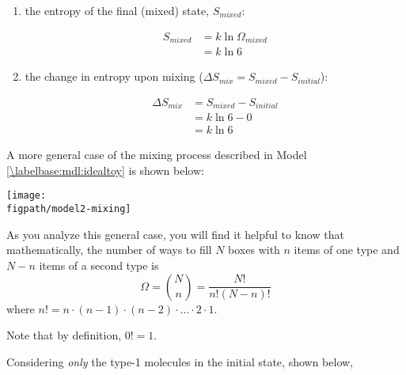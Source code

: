 \begin{activity}
\begin{ctqs}
\begin{enumerate}
			\item the entropy of the final (mixed) state, $S_{mixed}$:
			
				\begin{solution}[0.75in]
					\begin{align*}
						S_{mixed} &= k\ln\Omega_{mixed} \\
							&= k \ln 6
					\end{align*}
				\end{solution}
				
			\item the change in entropy upon mixing ($\Delta S_{mix} = S_{mixed} - S_{initial}$): 
			
				\begin{solution}[0.75in]
					\begin{align*}
						\Delta S_{mix} &= S_{mixed} - S_{initial} \\
							&= k \ln 6 - 0\\
							&= k \ln 6
					\end{align*}
				\end{solution}
				
		\end{enumerate}
		
\end{ctqs}

\begin{model}
	\label{\labelbase:mdl:idealgeneral}

	A more general case of the mixing process described in Model \ref{\labelbase:mdl:idealtoy} is shown below:
	
	\centerline{\texttt{[image: \\figpath/model2-mixing]}}
	
	As you analyze this general case, you will find it helpful to know that mathematically, the number of ways to fill $N$ boxes with $n$ items of one type and $N-n$ items of a second type is
	\begin{equation*}
		\Omega = {N \choose n} = \frac{N!}{n!(N-n)!}
	\end{equation*}
	where $n! = n\cdot(n-1)\cdot(n-2)\cdot\dots\cdot 2 \cdot 1$.
	
	Note that by definition, $0!=1$.

\end{model}

\vspace{0.05in}
\begin{ctqs}
		
		\question Considering \emph{only} the type-1 molecules in the initial state, shown below,
	

\end{ctqs}
\end{activity}
